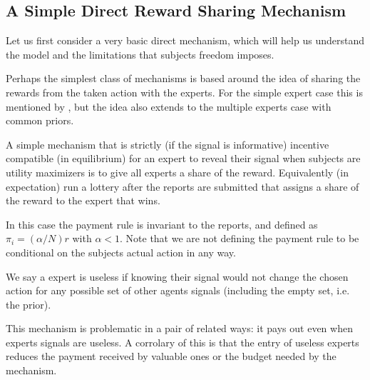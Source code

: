
\subsection{A Simple Direct Reward Sharing Mechanism}


Let us first consider a very basic direct mechanism, which will help us understand the model and the limitations that subjects freedom imposes. 

Perhaps the simplest class of mechanisms is based around the idea of sharing the rewards from the taken action with the experts. For the simple expert case this is mentioned by \cite{othman2010decision}, but the idea also extends to the multiple experts case with common priors. 

A simple mechanism that is strictly (if the signal is informative) incentive compatible (in equilibrium) for an expert to reveal their signal when subjects are utility maximizers is to give all experts a share of the reward. Equivalently (in expectation) run a lottery after the reports are submitted that assigns a share of the reward to the expert that wins. 

In this case the payment rule is invariant to the reports, and defined as $\pi_i  = (\alpha / N ) r $ with $\alpha < 1$. Note that we are not defining the payment rule to be conditional on the subjects actual action in any way. %

We say a expert is useless if knowing their signal would not change the chosen action for any possible set of other agents signals (including the empty set, i.e. the prior).

This mechanism is problematic in a pair of related ways: it pays out even when experts signals are useless.
A corrolary of this is that the entry of useless experts reduces the payment received by valuable ones or the budget needed by the mechanism.

